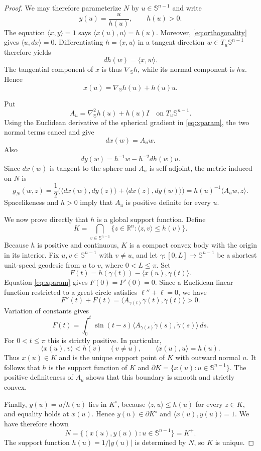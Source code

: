 \documentclass[11pt]{article}
\newcommand{\R}{\mathbb{R}}
\newcommand{\Sph}{\mathbb{S}}
\newcommand{\ip}[2]{\langle #1,#2\rangle}
\begin{document}
\begin{proof}
We may therefore parameterize $N$ by $u\in\Sph^{n-1}$ and write
\[
 y(u)=\frac{u}{h(u)},
 \qquad h(u)>0.
\]
The equation $\ip{x}{y}=1$ says $\ip{x(u)}{u}=h(u)$. Moreover,
\eqref{eq:orthogonality} gives $\ip{u}{dx}=0$. Differentiating
$h=\ip{x}{u}$ in a tangent direction $w\in T_u\Sph^{n-1}$ therefore yields
\[
 dh(w)=\ip{x}{w}.
\]
The tangential component of $x$ is thus $\nabla_{\Sph}h$, while its normal
component is $hu$. Hence
\begin{equation}\label{eq:xparam}
 x(u)=\nabla_{\Sph}h(u)+h(u)u.
\end{equation}

Put
\[
 A_u=\nabla_{\Sph}^2h(u)+h(u)I
 \quad\text{on }T_u\Sph^{n-1}.
\]
Using the Euclidean derivative of the spherical gradient in
\eqref{eq:xparam}, the two normal terms cancel and give
\[
 dx(w)=A_uw.
\]
Also
\[
 dy(w)=h^{-1}w-h^{-2}dh(w)u.
\]
Since $dx(w)$ is tangent to the sphere and $A_u$ is self-adjoint, the metric
induced on $N$ is
\begin{equation}\label{eq:metric}
 g_N(w,z)
 =\frac12\big(\ip{dx(w)}{dy(z)}+\ip{dx(z)}{dy(w)}\big)
 =h(u)^{-1}\ip{A_uw}{z}.
\end{equation}
Spacelikeness and $h>0$ imply that $A_u$ is positive definite for every $u$.

We now prove directly that $h$ is a global support function. Define
\[
 K=\bigcap_{v\in\Sph^{n-1}}
 \{z\in\R^n:\ip{z}{v}\le h(v)\}.
\]
Because $h$ is positive and continuous, $K$ is a compact convex body with the
origin in its interior. Fix $u,v\in\Sph^{n-1}$ with $v\ne u$, and let
$\gamma:[0,L]\to\Sph^{n-1}$ be a shortest unit-speed geodesic from $u$ to
$v$, where $0<L\le\pi$. Set
\[
 F(t)=h(\gamma(t))-\ip{x(u)}{\gamma(t)}.
\]
Equation \eqref{eq:xparam} gives $F(0)=F'(0)=0$. Since a Euclidean linear
function restricted to a great circle satisfies $\ell''+\ell=0$, we have
\[
 F''(t)+F(t)
 =\ip{A_{\gamma(t)}\dot\gamma(t)}{\dot\gamma(t)}>0.
\]
Variation of constants gives
\[
 F(t)=\int_0^t\sin(t-s)
 \ip{A_{\gamma(s)}\dot\gamma(s)}{\dot\gamma(s)}\,ds.
\]
For $0<t\le\pi$ this is strictly positive. In particular,
\[
 \ip{x(u)}{v}<h(v)\quad(v\ne u),
 \qquad
 \ip{x(u)}{u}=h(u).
\]
Thus $x(u)\in K$ and is the unique support point of $K$ with outward normal
$u$. It follows that $h$ is the support function of $K$ and
$\partial K=\{x(u):u\in\Sph^{n-1}\}$. The positive definiteness of $A_u$
shows that this boundary is smooth and strictly convex.

Finally, $y(u)=u/h(u)$ lies in $K^\circ$, because
$\ip{z}{u}\le h(u)$ for every $z\in K$, and equality holds at $x(u)$. Hence
$y(u)\in\partial K^\circ$ and
$\ip{x(u)}{y(u)}=1$. We have therefore shown
\[
 N=\{(x(u),y(u)):u\in\Sph^{n-1}\}=K^+.
\]
The support function $h(u)=1/|y(u)|$ is determined by $N$, so $K$ is unique.
\end{proof}
\end{document}
